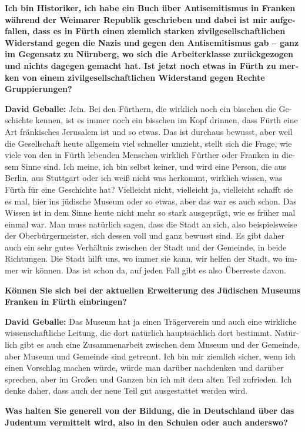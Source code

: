 \begin{otherlanguage}{ngerman}
\textbf{Ich bin Historiker, ich habe ein Buch über Antisemitismus in Franken während der Weimarer Republik geschrieben und dabei ist mir aufgefallen, dass es in Fürth einen ziemlich starken zivilgesellschaftlichen Widerstand gegen die Nazis und gegen den Antisemitismus gab – ganz im Gegensatz zu Nürnberg, wo sich die Arbeiterklasse zurückgezogen und nichts dagegen gemacht hat. Ist jetzt noch etwas in Fürth zu merken von einem zivilgesellschaftlichen Widerstand gegen Rechte Gruppierungen?} 

\textbf{David Geballe:} Jein. Bei den Fürthern, die wirklich noch ein bisschen die Geschichte kennen, ist es immer noch ein bisschen im Kopf drinnen, dass Fürth eine Art fränkisches Jerusalem ist und so etwas. Das ist durchaus bewusst, aber weil die Gesellschaft heute allgemein viel schneller umzieht, stellt sich die Frage, wie viele von den in Fürth lebenden Menschen wirklich Fürther oder Franken in diesem Sinne sind. Ich meine, ich bin selbst keiner, und wird eine Person, die aus Berlin, aus Stuttgart oder ich weiß nicht was herkommt, wirklich wissen, was Fürth für eine Geschichte hat? Vielleicht nicht, vielleicht ja, vielleicht schafft sie es mal, hier ins jüdische Museum oder so etwas, aber das war es auch schon. Das Wissen ist in dem Sinne heute nicht mehr so stark ausgeprägt, wie es früher mal einmal war. Man muss natürlich sagen, dass die Stadt an sich, also beispielsweise der Oberbürgermeister, sich dessen voll und ganz bewusst sind. Es gibt daher auch ein sehr gutes Verhältnis zwischen der Stadt und der Gemeinde, in beide Richtungen. Die Stadt hilft uns, wo immer sie kann, wir helfen der Stadt, wo immer wir können. Das ist schon da, auf jeden Fall gibt es also Überreste davon. 

\textbf{Können Sie sich bei der aktuellen Erweiterung des Jüdischen Museums Franken in Fürth einbringen?}

\textbf{David Geballe:} Das Museum hat ja einen Trägerverein und auch eine wirkliche wissenschaftliche Leitung, die dort natürlich hauptsächlich dort bestimmt. Natürlich gibt es auch eine Zusammenarbeit zwischen dem Museum und der Gemeinde, aber Museum und Gemeinde sind getrennt. Ich bin mir ziemlich sicher, wenn ich einen Vorschlag machen würde, würde man darüber nachdenken und darüber sprechen, aber im Großen und Ganzen bin ich mit dem alten Teil zufrieden. Ich denke daher, dass auch der neue Teil gut ausgestattet werden wird. 

\textbf{Was halten Sie generell von der Bildung, die in Deutschland über das Judentum vermittelt wird, also in den Schulen oder auch anderswo?} 


\end{otherlanguage}
